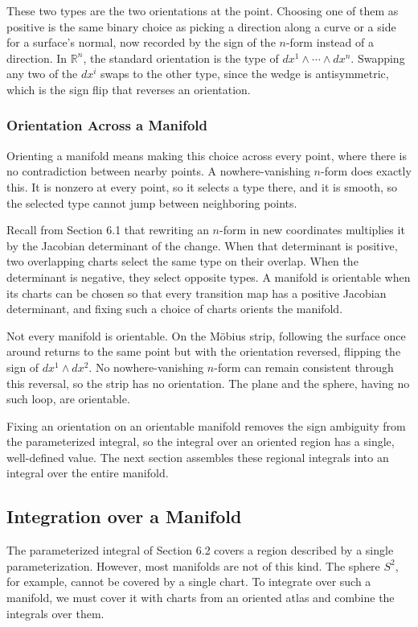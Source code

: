 \documentclass[12pt]{article}
\newcommand{\R}{\mathbb{R}}
\begin{document}
These two types are the two orientations at the point. Choosing one of them as positive is the same binary choice as picking a direction along a curve or a side for a surface's normal, now recorded by the sign of the $n$-form instead of a direction. In $\R^n$, the standard orientation is the type of $dx^1 \wedge \cdots \wedge dx^n$. Swapping any two of the $dx^i$ swaps to the other type, since the wedge is antisymmetric, which is the sign flip that reverses an orientation.

\subsubsection{Orientation Across a Manifold}

Orienting a manifold means making this choice across every point, where there is no contradiction between nearby points. A nowhere-vanishing $n$-form does exactly this. It is nonzero at every point, so it selects a type there, and it is smooth, so the selected type cannot jump between neighboring points.

Recall from Section 6.1 that rewriting an $n$-form in new coordinates multiplies it by the Jacobian determinant of the change. When that determinant is positive, two overlapping charts select the same type on their overlap. When the determinant is negative, they select opposite types. A manifold is orientable when its charts can be chosen so that every transition map has a positive Jacobian determinant, and fixing such a choice of charts orients the manifold.

Not every manifold is orientable. On the M\"obius strip, following the surface once around returns to the same point but with the orientation reversed, flipping the sign of $dx^1 \wedge dx^2$. No nowhere-vanishing $n$-form can remain consistent through this reversal, so the strip has no orientation. The plane and the sphere, having no such loop, are orientable.

Fixing an orientation on an orientable manifold removes the sign ambiguity from the parameterized integral, so the integral over an oriented region has a single, well-defined value. The next section assembles these regional integrals into an integral over the entire manifold.

\subsection{Integration over a Manifold}

The parameterized integral of Section 6.2 covers a region described by a single parameterization. However, most manifolds are not of this kind. The sphere $S^2$, for example, cannot be covered by a single chart. To integrate over such a manifold, we must cover it with charts from an oriented atlas and combine the integrals over them.
\end{document}

